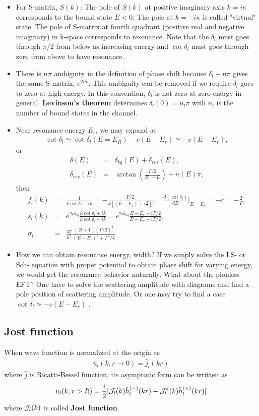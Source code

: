 \documentclass[10pt]{book}
\newcommand{\bea}{\begin{eqnarray}}
\newcommand{\eea}{\end{eqnarray}}
\newcommand{\no}{\nonumber \\}
\begin{document}
\begin{itemize}
     
     
\item For S-matrix, $S(k)$: The pole of $S(k)$ at  
positive imaginary axis $k=i\kappa $ corresponds to the bound state $E<0$.
The pole at $k=-i\kappa$ is called "virtual" state. The pole of S-matrix
at fourth quadrant (positive real and negative imaginary) in k-space 
corresponds to resonance. Note that the $\delta_l$ must goes through $\pi/2$
from below as increasing energy and $\cot\delta_l$ must goes through
zero from above to have resonance.

\item There is $n\pi$ ambiguity in the definition of phase shift because 
$\delta_l+n\pi $ gives the same S-matrix, $e^{2i\delta_l}$. This ambiguity
can be removed if we require $\delta_l$ goes to zero at high energy. 
In this convention, $\delta_l$ is not zero at zero energy in general.
{\bf Levinson's theorem} determines $\delta_l(0)=n_l\pi$ with $n_l$ is the number 
of bound states in the channel.

\item Near resonance energy $E_r$, we may expand as
\bea 
\cot\delta_l \simeq \cot\delta_l(E=E_R)-c(E-E_r)\simeq -c(E-E_r),
\eea 
or
\bea 
\delta(E)&=&\delta_{bg}(E)+\delta_{res}(E),\no 
\delta_{res}(E)&=&\arctan(\frac{\Gamma/2}{E_r-E})+n(E)\pi, 
\eea 
then
\bea 
f_l(k)&=&\frac{1}{k\cot\delta_l-ik}=-\frac{\Gamma/2}{k\left[(E-E_r)+i\frac{\Gamma}{2}\right] },
\quad \frac{d(\cot\delta_l)}{dE}|_{E=E_r}=-c=-\frac{2}{\Gamma},\no 
s_l(k)&=&e^{2i\delta_{bg}}\frac{k\cot\delta_l+ik}{k\cot\delta_l-ik}
       =e^{2i\delta_{bg}}\frac{E-E_r-i\Gamma/2}{E-E_r+i\Gamma/2} ,\no 
\sigma_l&=&\frac{4\pi}{k^2}\frac{(2l+1)(\Gamma/2)^2}{(E-E_r)^2+\Gamma^2/4}
\eea 

\item How we can obtain resonance energy, width? If we simply solve the LS- or Sch- equation
      with proper potential to obtain phase shift for varying energy, 
      we would get the resonance behavior naturally.
     What about the pionless EFT? One have to solve the scattering amplitude with diagrams
     and find a pole position of scattering amplitude. 
     Or one may try to find a case $\cot\delta_l\simeq -c (E-E_r)$ . 
\end{itemize}

\subsection{Jost function}
When wave function is normalized at the origin as
\bea 
\bar{u}_l(k,r\to 0)=\hat{j}_l(kr) 
\eea 
where $\hat{j}$ is Ricatti-Bessel function,
its asymptotic form can be written as
\bea 
\bar{u}_l(k,r>R)=\frac{i}{2}[ {\cal J}_l(k) \hat{h}^{(-)}_l(kr)-{\cal J}^*_l(k) \hat{h}^{(+)}_l(kr) ]
\eea 
where ${\cal J}_l(k)$ is called {\bf Jost function}. 
\end{document}
